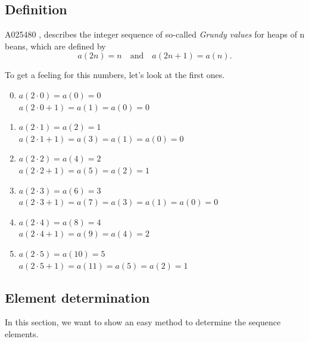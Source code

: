 \documentclass[12pt]{../document-templates/papers/one-column-mydashie/mydashie}
\newtheorem*{theorem A}{Theorem A}
\newtheorem*{theorem B}{N\"olker's Theorem}
\theoremstyle{remark}
\theoremstyle{remark}
\begin{document}
\subsection{Definition}
\label{ss:definition}
A025480 \cite{GrundyValues}, describes the integer sequence of so-called \textit{Grundy values} for heaps of n beans, which are defined by
\begin{equation}
    a\left(2n\right) = n \quad \mathrm{and} \quad a\left(2n+1\right) = a\left(n\right).
\label{eq:grundyvalues}
\end{equation}

To get a feeling for this numbers, let's look at the first ones.
\begin{enumerate}
    \setcounter{enumi}{-1}
    \item
        $a\left(2\cdot 0\right) = a\left(0\right) = 0$\\
        $a\left(2\cdot 0 + 1\right) = a\left(1\right) = a\left(0\right) = 0$
    \item
        $a\left(2\cdot 1\right) = a\left(2\right) = 1$\\
        $a\left(2\cdot 1 + 1\right) = a\left(3\right) = a\left(1\right) = a\left(0\right) = 0$
    \item
        $a\left(2\cdot 2\right) = a\left(4\right) = 2$\\
        $a\left(2\cdot 2 + 1\right) = a\left(5\right) = a\left(2\right) = 1$
    \item
        $a\left(2\cdot 3\right) = a\left(6\right) = 3$\\
        $a\left(2\cdot 3 + 1\right) = a\left(7\right) = a\left(3\right) = a\left(1\right) = a\left(0\right) = 0$
    \item
        $a\left(2\cdot 4\right) = a\left(8\right) = 4$\\
        $a\left(2\cdot 4 + 1\right) = a\left(9\right) = a\left(4\right) = 2$
    \item
        $a\left(2\cdot 5\right) = a\left(10\right) = 5$\\
        $a\left(2\cdot 5 + 1\right) = a\left(11\right) = a\left(5\right) = a\left(2\right) = 1$      
\end{enumerate}
\subsection{Element determination}
\label{ss:elementdetermination}
In this section, we want to show an easy method to determine the sequence elements.\\
\end{document}

